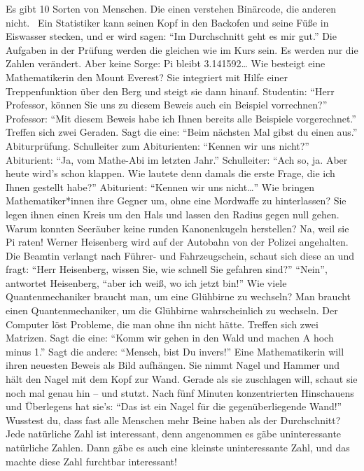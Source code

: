 {	%
	\or Es gibt 10 Sorten von Menschen. Die einen verstehen Binärcode, die anderen nicht.
	\or\ 
	\or Ein Statistiker kann seinen Kopf in den Backofen und seine Füße in Eiswasser stecken, und er wird sagen: \enquote{Im Durchschnitt geht es mir gut.}
	\or Die Aufgaben in der Prüfung werden die gleichen wie im Kurs sein. Es werden nur die Zahlen verändert. Aber keine Sorge: Pi bleibt 3.141592…
	\or Wie besteigt eine Mathematikerin den Mount Everest? Sie integriert mit Hilfe einer Treppenfunktion über den Berg und steigt sie dann hinauf.
	\or Studentin: \enquote{Herr Professor, können Sie uns zu diesem Beweis auch ein Beispiel vorrechnen?} Professor: \enquote{Mit diesem Beweis habe ich Ihnen bereits alle Beispiele vorgerechnet.}
	\or Treffen sich zwei Geraden. Sagt die eine: \enquote{Beim nächsten Mal gibst du einen aus.}
	\or Abiturprüfung. Schulleiter zum Abiturienten: \enquote{Kennen wir uns nicht?} Abiturient: \enquote{Ja, vom Mathe-Abi im letzten Jahr.} Schulleiter: \enquote{Ach so, ja. Aber heute wird's schon klappen. Wie lautete denn damals die erste Frage, die ich Ihnen gestellt habe?} Abiturient: \enquote{Kennen wir uns nicht…}	
	\or Wie bringen Mathematiker*innen ihre Gegner um, ohne eine Mordwaffe zu hinterlassen? Sie legen ihnen einen Kreis um den Hals und lassen den Radius gegen null gehen.
	\or Warum konnten Seeräuber keine runden Kanonenkugeln herstellen? Na, weil sie Pi raten!
	\or Werner Heisenberg wird auf der Autobahn von der Polizei angehalten. Die Beamtin verlangt nach Führer- und Fahrzeugschein, schaut sich diese an und fragt: \enquote{Herr Heisenberg, wissen Sie, wie schnell Sie gefahren sind?} \enquote{Nein}, antwortet Heisenberg, \enquote{aber ich weiß, wo ich jetzt bin!}
	\or Wie viele Quantenmechaniker braucht man, um eine Glühbirne zu wechseln? Man braucht einen Quantenmechaniker, um die Glühbirne wahrscheinlich zu wechseln.
	\or Der Computer löst Probleme, die man ohne ihn nicht hätte.
	\or Treffen sich zwei Matrizen. Sagt die eine: \enquote{Komm wir gehen in den Wald und machen A hoch minus 1.} Sagt die andere: \enquote{Mensch, bist Du invers!}
	\or Eine Mathematikerin will ihren neuesten Beweis als Bild aufhängen. Sie nimmt Nagel und Hammer und hält den Nagel mit dem Kopf zur Wand. Gerade als sie zuschlagen will, schaut sie noch mal genau hin -- und stutzt. Nach fünf Minuten konzentrierten Hinschauens und Überlegens hat sie's: \enquote{Das ist ein Nagel für die gegenüberliegende Wand!}
	\or Wusstest du, dass fast alle Menschen mehr Beine haben als der Durchschnitt?
	\or Jede natürliche Zahl ist interessant, denn angenommen es gäbe uninteressante natürliche Zahlen. Dann gäbe es auch eine kleinste uninteressante Zahl, und das machte diese Zahl furchtbar interessant!
}
